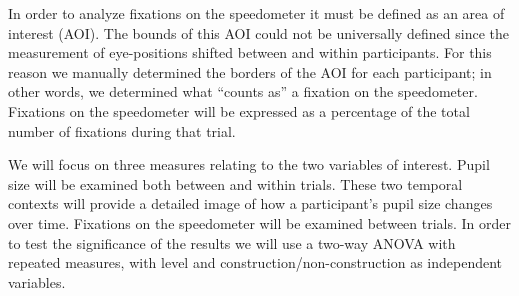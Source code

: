 In order to analyze fixations on the speedometer it must be defined as an area of interest (AOI).
The bounds of this AOI could not be universally defined since the measurement of eye-positions shifted between and within participants.
For this reason we manually determined the borders of the AOI for each participant; in other words, we determined what ``counts as'' a fixation on the speedometer.
Fixations on the speedometer will be expressed as a percentage of the total number of fixations during that trial.

We will focus on three measures relating to the two variables of interest. 
Pupil size will be examined both between and within trials.
These two temporal contexts will provide a detailed image of how a participant's pupil size changes over time.
Fixations on the speedometer will be examined between trials. 
In order to test the significance of the results we will use a two-way ANOVA with repeated measures, with \nback level and construction/non-construction as independent variables.